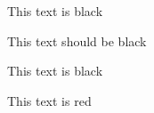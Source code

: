 \documentclass{article}
\begin{document}
\Huge
This text is black

\pagebreak
This text should be black

\pagebreak
This text is black

\color{red}
This text is red
\end{document}
